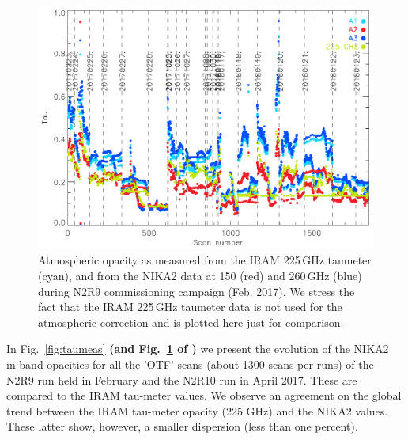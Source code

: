 \begin{figure}[ht]
\begin{center}
\includegraphics[scale=1.0]{Figures/opacity_evol_run_9_12_14.pdf}
\caption[Zenith opacity monitoring during N2R9, N2R12 and N2R14]{Atmospheric opacity as measured from the IRAM 225\,GHz taumeter
(cyan), and from the NIKA2 data at 150 (red) and 260\,GHz (blue) during N2R9
commissioning campaign (Feb. 2017). We stress the fact that the IRAM 225\,GHz
taumeter data is not used for the atmospheric correction and is plotted here
just for comparison.
  \label{fig:taumeas_paper}}
\end{center}
\end{figure}




In Fig.~\ref{fig:taumeas} {\bf(and Fig.~\ref{fig:taumeas_paper} of
  \cite{Adam18}) } we present the evolution of the NIKA2 in-band
opacities for all the 'OTF' scans (about 1300 scans per runs) of the
N2R9 run held in February and the N2R10 run in April 2017. These are
compared to the IRAM tau-meter values. We observe an agreement on the global trend between the IRAM tau-meter opacity (225 GHz) and the NIKA2 values. These latter show, however,
a smaller dispersion (less than one percent).


